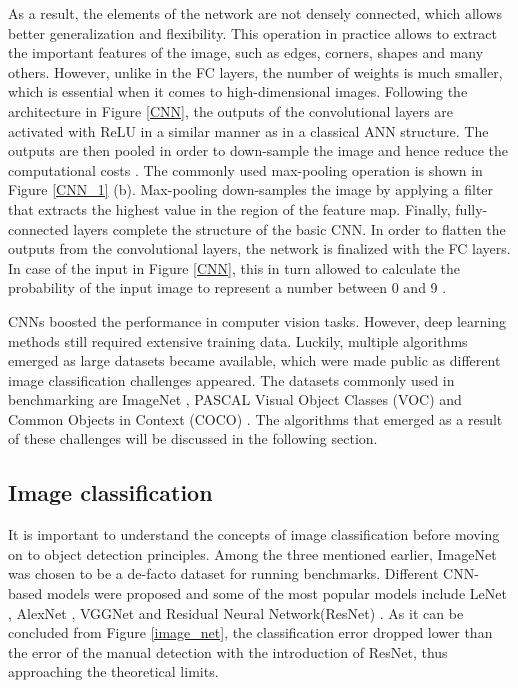 As a result, the elements of the network  are not densely connected, which allows better generalization and flexibility. This operation in practice allows to extract the important features of the image, such as edges, corners, shapes and many others.  However, unlike in the FC layers, the number of weights is much smaller, which is essential when it comes to high-dimensional images. Following the architecture in Figure \ref{CNN}, the outputs of the convolutional layers are activated with ReLU in a similar manner as in a classical ANN structure. The outputs are then pooled in order to down-sample the image and hence reduce the computational costs \cite{Liu2016}. The commonly used max-pooling operation is shown in Figure \ref{CNN_1} (b). Max-pooling down-samples the image by applying a filter that extracts the highest value in the region of the feature map. Finally, fully-connected layers complete the structure of the basic CNN. In order to flatten the outputs from the convolutional layers, the network is finalized with the FC layers. In case of the input in Figure \ref{CNN}, this in turn allowed to calculate the probability of the input image to represent a number between 0 and 9 \cite{Mahony2019}.

CNNs boosted the performance in computer vision tasks. However, deep learning methods still required extensive training data. Luckily, multiple algorithms emerged as large datasets became available, which were made public as different image classification challenges appeared. The  datasets commonly used in benchmarking are ImageNet \cite{Russakovsky2014}, PASCAL Visual Object Classes (VOC) \cite{Everingham10} and Common Objects in Context (COCO) \cite{Lin2014}. The algorithms that emerged as a result of these challenges will be discussed in the following section. 
\FloatBarrier

\subsection{Image classification}
\label{classification_section} 
It is important to understand the concepts of image classification before moving on to object detection principles. Among the three mentioned earlier, ImageNet was chosen to be a de-facto dataset for running benchmarks.  Different CNN-based models were proposed and some of the most popular models include LeNet \cite{lecun-gradientbased-learning-applied-1998}, AlexNet \cite{NIPS2012_c399862d}, VGGNet \cite{Simonyan2014} and Residual Neural Network(ResNet) \cite{He2015}. As it can be concluded from Figure \ref{image_net}, the classification error dropped lower than the error of the manual detection with the introduction of ResNet, thus approaching the theoretical limits. 

